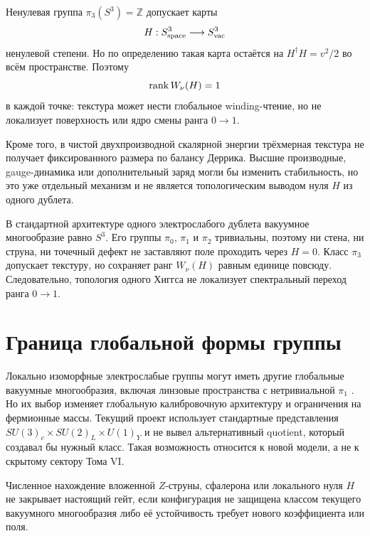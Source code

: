 Ненулевая группа $\pi_3(S^3)=\mathbb Z$ допускает карты
\begin{equation}
 H:S^3_{\rm space}\longrightarrow S^3_{\rm vac}
\end{equation}
ненулевой степени. Но по определению такая карта остаётся на
$H^\dagger H=v^2/2$ во всём пространстве. Поэтому
\begin{equation}
 \operatorname{rank} W_\nu(H)=1
\end{equation}
в каждой точке: текстура может нести глобальное winding-чтение, но не
локализует поверхность или ядро смены ранга $0\to1$.

Кроме того, в чистой двухпроизводной скалярной энергии трёхмерная текстура
не получает фиксированного размера по балансу Деррика. Высшие производные,
gauge-динамика или дополнительный заряд могли бы изменить стабильность,
но это уже отдельный механизм и не является топологическим выводом нуля
$H$ из одного дублета.

\begin{theorem}
В стандартной архитектуре одного электрослабого дублета вакуумное
многообразие равно $S^3$. Его группы $\pi_0$, $\pi_1$ и $\pi_2$
тривиальны, поэтому ни стена, ни струна, ни точечный дефект не заставляют
поле проходить через $H=0$. Класс $\pi_3$ допускает текстуру, но сохраняет
ранг $W_\nu(H)$ равным единице повсюду. Следовательно, топология одного
Хиггса не локализует спектральный переход ранга $0\to1$.
\end{theorem}

\section{Граница глобальной формы группы}

Локально изоморфные электрослабые группы могут иметь другие глобальные
вакуумные многообразия, включая линзовые пространства с нетривиальной
$\pi_1$ \cite{higgs-topology-gripaios-randal-williams2017}. Но их выбор изменяет
глобальную калибровочную архитектуру и ограничения на фермионные массы.
Текущий проект использует стандартные представления
$SU(3)_c\times SU(2)_L\times U(1)_Y$ и не вывел альтернативный quotient,
который создавал бы нужный класс. Такая возможность относится к новой
модели, а не к скрытому сектору Тома VI.

\begin{nogocriterion}
Численное нахождение вложенной $Z$-струны, сфалерона или локального нуля
$H$ не закрывает настоящий гейт, если конфигурация не защищена классом
текущего вакуумного многообразия либо её устойчивость требует нового
коэффициента или поля.
\end{nogocriterion}


